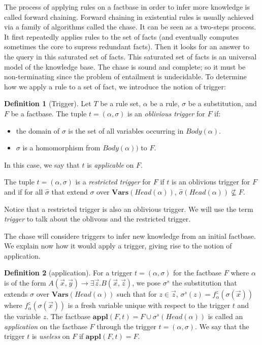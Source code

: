 \documentclass{article}
\theoremstyle{definition}
\newtheorem{definition}{Definition}[section]
\theoremstyle{remark}
\newcommand{\Vars}{\textbf{Vars}}
\newcommand{\Appl}{\textbf{appl}}
\begin{document}
The process of applying rules on a factbase in order to infer more knowledge is called forward chaining.   Forward  chaining  in  existential  rules  is  usually achieved  via  a  family  of  algorithms  called the  chase. It can be seen as a two-steps process. It first repeatedly applies rules to the set of facts (and eventually computes sometimes the core to supress redundant facts). Then it looks for an answer to the query in this saturated set of facts. This saturated set of facts is an universal model of the knowledge base. The chase is sound and complete; so it must be non-terminating since the problem of entailment is undecidable. To determine how we apply a rule to a set of fact, we introduce the notion of trigger:

\begin{definition}[Trigger]
Let $T$ be a rule set, $\alpha$ be a rule, $\sigma$ be a substitution, and $F$ be a factbase. The tuple $t = (\alpha,\sigma)$ is an \emph{oblivious trigger} for $F$ if: 
\begin{itemize}
\item the domain of $\sigma$ is the set of all variables occurring in $Body(\alpha)$.
\item $\sigma$ is a homomorphism from $Body(\alpha))$ to $F$.
\end{itemize}
In this case, we say that $t$ is \emph{applicable} on $F$.

The tuple $t = (\alpha,\sigma)$ is a \emph{restricted trigger} for $F$ if $t$ is an oblivious trigger for $F$ and if for all $\hat \sigma$ that extend $\sigma$ over $\Vars(\textit{Head}(\alpha))$, $\hat \sigma(Head(\alpha)) \nsubseteq F$.
\end{definition} 



Notice that a restricted trigger is also an oblivious trigger. We will use the term \emph{trigger} to talk about the oblivous and the restricted trigger.

The chase will considere triggers to infer new knowledge from an initial factbase. We explain now how it would apply a trigger, giving rise to the notion of application. 

\begin{definition}[application]
For a trigger $t = (\alpha,\sigma)$ for the factbase $F$ where $\alpha$ is of the form $A(\vec x,\vec y) \rightarrow \exists \vec z. B(\vec x,\vec z)$, we pose \emph{$\sigma^s$} the substitution that extends $\sigma$ over $\Vars(\textit{Head}(\alpha))$ such that for $z \in \vec z$, $\sigma^s(z) = f^z_\alpha(\sigma(\vec x))$ where $f^z_\alpha(\sigma(\vec x))$ is a fresh variable unique with respect to the trigger $t$ and the variable $z$.
The factbase $\Appl(F,t)=F \cup \sigma^s(\textit{Head}(\alpha))$ is called an \emph{application} on the factbase $F$ through the trigger $t = (\alpha,\sigma)$. We say that the trigger $t$ is \emph{useless} on $F$ if $\Appl(F,t) = F$.
\end{definition}
\end{document}
